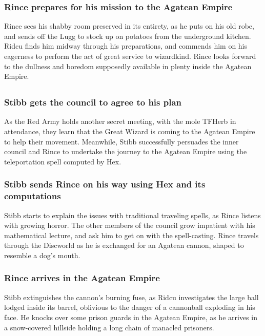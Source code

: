\subsubsection{\Gls{Rince} prepares for his mission to the Agatean Empire}
\Gls{Rince} sees his shabby room preserved in its entirety, as he puts on his old robe, and sends
off the \Gls{Lugg} to stock up on potatoes from the underground kitchen. \Gls{Ridcu} finds him
midway through his preparations, and commends him on his eagerness to perform the act of great
service to wizardkind. \Gls{Rince} looks forward to the dullness and boredom supposedly available
in plenty inside the Agatean Empire.

\subsection{}
\subsubsection{\Gls{Stibb} gets the council to agree to his plan}
As the Red Army holds another secret meeting, with the mole \Gls{TFHerb} in attendance, they learn
that the Great Wizard is coming to the Agatean Empire to help their movement. Meanwhile, \Gls{Stibb}
successfully persuades the inner council and \Gls{Rince} to undertake the journey to the Agatean
Empire using the teleportation spell computed by \Gls{Hex}.

\subsubsection{\Gls{Stibb} sends \Gls{Rince} on his way using \Gls{Hex} and its computations}
\Gls{Stibb} starts to explain the issues with traditional traveling spells, as \Gls{Rince} listens
with growing horror. The other members of the council grow impatient with his mathematical lecture,
and ask him to get on with the spell-casting. \Gls{Rince} travels through the Discworld as he is
exchanged for an Agatean cannon, shaped to resemble a dog's mouth.

\subsubsection{\Gls{Rince} arrives in the Agatean Empire}
\Gls{Stibb} extinguishes the cannon's burning fuse, as \Gls{Ridcu} investigates the large ball
lodged inside its barrel, oblivious to the danger of a cannonball exploding in his face. He knocks
over some prison guards in the Agatean Empire, as he arrives in a snow-covered hillside holding a
long chain of manacled prisoners.

